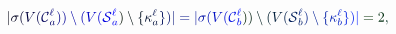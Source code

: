\documentclass[12pt]{article}
\begin{document}
\makeatletter
\renewcommand*{\@textcolor}[3]{%
  \protect\leavevmode
  \begingroup
    \color#1{#2}#3%
  \endgroup
}
\makeatother
\begin{displaymath}
\mathcolor[RGB]{0,0,15}{|} \mathcolor[RGB]{0,0,30}{\sigma} \mathcolor[RGB]{0,0,45}{(} \mathcolor[RGB]{0,0,60}{V} \mathcolor[RGB]{0,0,75}{(} \mathcal { \mathcolor[RGB]{0,0,90}{C} } _ { \mathcolor[RGB]{0,0,105}{a} } ^ { \mathcolor[RGB]{0,0,120}{\ell} } \mathcolor[RGB]{0,0,135}{)} \mathcolor[RGB]{0,0,150}{)} \mathcolor[RGB]{0,0,165}{\setminus} \mathcolor[RGB]{0,0,180}{(} \mathcolor[RGB]{0,0,195}{V} \mathcolor[RGB]{0,0,210}{(} \mathcal { \mathcolor[RGB]{0,0,225}{S} } _ { \mathcolor[RGB]{0,0,240}{a} } ^ { \mathcolor[RGB]{0,0,255}{\ell} } \mathcolor[RGB]{0,15,0}{)} \mathcolor[RGB]{0,15,15}{\setminus} \mathcolor[RGB]{0,15,30}{\{} \mathcolor[RGB]{0,15,45}{\kappa} _ { \mathcolor[RGB]{0,15,60}{a} } ^ { \mathcolor[RGB]{0,15,75}{\ell} } \mathcolor[RGB]{0,15,90}{\}} \mathcolor[RGB]{0,15,105}{)} \mathcolor[RGB]{0,15,120}{|} \mathcolor[RGB]{0,15,135}{=} \mathcolor[RGB]{0,15,150}{|} \mathcolor[RGB]{0,15,165}{\sigma} \mathcolor[RGB]{0,15,180}{(} \mathcolor[RGB]{0,15,195}{V} \mathcolor[RGB]{0,15,210}{(} \mathcal { \mathcolor[RGB]{0,15,225}{C} } _ { \mathcolor[RGB]{0,15,240}{b} } ^ { \mathcolor[RGB]{0,15,255}{\ell} } \mathcolor[RGB]{0,30,0}{)} \mathcolor[RGB]{0,30,15}{)} \mathcolor[RGB]{0,30,30}{\setminus} \mathcolor[RGB]{0,30,45}{(} \mathcolor[RGB]{0,30,60}{V} \mathcolor[RGB]{0,30,75}{(} \mathcal { \mathcolor[RGB]{0,30,90}{S} } _ { \mathcolor[RGB]{0,30,105}{b} } ^ { \mathcolor[RGB]{0,30,120}{\ell} } \mathcolor[RGB]{0,30,135}{)} \mathcolor[RGB]{0,30,150}{\setminus} \mathcolor[RGB]{0,30,165}{\{} \mathcolor[RGB]{0,30,180}{\kappa} _ { \mathcolor[RGB]{0,30,195}{b} } ^ { \mathcolor[RGB]{0,30,210}{\ell} } \mathcolor[RGB]{0,30,225}{\}} \mathcolor[RGB]{0,30,240}{)} \mathcolor[RGB]{0,30,255}{|} \mathcolor[RGB]{0,45,0}{=} \mathcolor[RGB]{0,45,15}{2} \mathcolor[RGB]{0,45,30}{,}
\end{displaymath}
\end{document}
